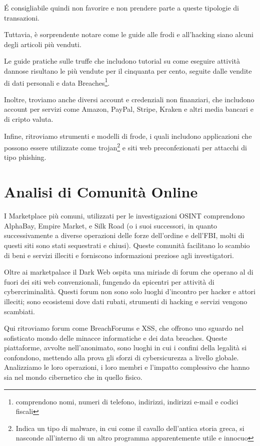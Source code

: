 \'E consigliabile quindi non favorire e non prendere parte a queste tipologie di transazioni.

Tuttavia, è sorprendente notare come le guide alle frodi e all’hacking siano alcuni degli articoli più venduti.

Le guide pratiche sulle truffe che includono tutorial su come eseguire attività dannose risultano le più vendute per il cinquanta per cento, seguite dalle vendite di dati personali e data Breaches\footnote{comprendono nomi, numeri di telefono, indirizzi, indirizzi e-mail e codici fiscali}.

Inoltre, troviamo anche diversi account e credenziali non finanziari, che includono account per servizi come Amazon, PayPal, Stripe, Kraken e altri media bancari e di cripto valuta.

Infine, ritroviamo strumenti e modelli di frode, i quali includono applicazioni che possono essere utilizzate come trojan\footnote{Indica un tipo di malware, in cui come il cavallo dell'antica storia greca, si nasconde all'interno di un altro programma apparentemente utile e innocuo} e siti web preconfezionati per attacchi di tipo phishing.\cite{implic2}


\section{Analisi di Comunità Online}\label{sec:cap_sec_impl4}

I Marketplace più comuni, utilizzati per le investigazioni OSINT comprendono AlphaBay, Empire Market, e Silk Road (o i suoi successori, in quanto successivamente a diverse operazioni delle forze dell'ordine e dell'FBI, molti di questi siti sono stati sequestrati e chiusi). Queste comunità facilitano lo scambio di beni e servizi illeciti e forniscono informazioni preziose agli investigatori.

Oltre ai marketpalace il Dark Web ospita una miriade di forum che operano al di fuori dei siti web convenzionali, fungendo da epicentri per attività di cybercriminalità. Questi forum non sono solo luoghi d'incontro per hacker e attori illeciti; sono ecosistemi dove dati rubati, strumenti di hacking e servizi vengono scambiati.

Qui ritroviamo forum come BreachForums e XSS, che offrono uno sguardo nel sofisticato mondo delle minacce informatiche e dei data breaches. Queste piattaforme, avvolte nell'anonimato, sono luoghi in cui i confini della legalità si confondono, mettendo alla prova gli sforzi di cybersicurezza a livello globale. Analizziamo le loro operazioni, i loro membri e l'impatto complessivo che hanno sia nel mondo cibernetico che in quello fisico.

